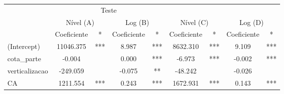 \begingroup
\fontsize{12.0pt}{14.4pt}\selectfont
\begin{longtable}{lcccccccc}
\toprule
 & \multicolumn{4}{c}{Teste} &  &  &  &  \\ 
\cmidrule(lr){2-5}
 & \multicolumn{2}{c}{Nível (A)    } & \multicolumn{2}{c}{Log (B)    } & \multicolumn{2}{c}{Nível (C)    } & \multicolumn{2}{c}{Log (D)    } \\ 
\cmidrule(lr){2-3} \cmidrule(lr){4-5} \cmidrule(lr){6-7} \cmidrule(lr){8-9}
  & Coeficiente & * & Coeficiente  & *  & Coeficiente   & *   & Coeficiente    & *    \\ 
\midrule\addlinespace[2.5pt]
(Intercept) & 11046.375 & *** & 8.987 & *** & 8632.310 & *** & 9.109 & *** \\ 
cota\_parte & -0.004 &  & 0.000 & *** & -6.973 & *** & -0.002 & *** \\ 
verticalizacao & -249.059 &  & -0.075 & ** & -48.242 &  & -0.026 &  \\ 
CA & 1211.554 & *** & 0.243 & *** & 1672.931 & *** & 0.143 & *** \\ 
\bottomrule
\end{longtable}
\endgroup

